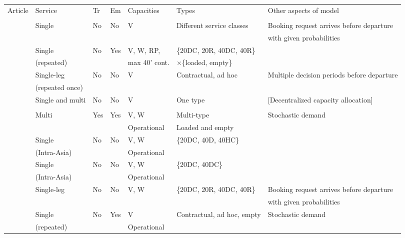 \begin{sidewaystable}[htbp]
\begin{scriptsize}
\begin{threeparttable}
\begin{tabular}{l|llllll}
Article				& Service				& Tr		& Em	 	& Capacities 	& Types 								& Other aspects of model \\
&&&&&&\\
\hline	
\citet{Maragos94}	& Single 				& No 		& No		& V 			& Different service classes				& Booking request arrives before departure\\
					&						& 			&			& 				& 										& with given probabilities\\
\citet{Ting04}		& Single 				& No 		& Yes		& V, W, RP, 	& \{20DC, 20R, 40DC, 40R\} 				&\\
					& (repeated)  			& 	 		& 			& max 40' cont. & $\times$\{loaded, empty\}				&\\
\citet{Lee07}		& Single-leg  			& No\tn{1}	& No		& V				& Contractual, ad hoc 					& Multiple decision periods before departure\\
					& (repeated once)		& 	 		& 			& 				& 										&\\
\citet{Demirag07}	& Single and multi 		& No 		& No		& V				& One type 								& [Decentralized capacity allocation]\\
&&&&&&\\
\citet{Xianzhi07}	& Multi 				& Yes		& Yes		& V, W			& Multi-type 							& Stochastic demand\\
					&						&			&			&	Operational	& Loaded and empty 						&\\
\citet{Feng07}		& Single 				& No 		& No		& V, W			& \{20DC, 40D, 40HC\} 					&\\
					&	(Intra-Asia) 		& 			&			& Operational	& 										&\\
\citet{Feng08}		& Single 				& No 		& No		& V, W			& \{20DC, 40DC\} 						&\\
					&	(Intra-Asia) 		& 			&			& Operational	& 										&\\
\citet{Bingzhou08}	& Single-leg 			& No 		& No\tn{2}	& V, W			& \{20DC, 20R, 40DC, 40R\}\tn{4}		& Booking request arrives before departure\\
					&						& 			&			& 				& 										& with given probabilities\\
\citet{Zou08}		& Single 				& No 		& Yes		& V				& Contractual, ad hoc, empty 			& Stochastic demand\\
					& (repeated) 			& 			&			& Operational	& 										&\\

\end{tabular}
\end{threeparttable}
\end{scriptsize}
\end{sidewaystable}
